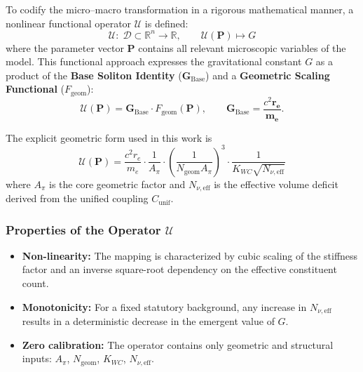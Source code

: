 \documentclass[10pt,a4paper]{article}
\begin{document}
To codify the micro–macro transformation in a rigorous mathematical manner, a nonlinear functional operator \(\mathcal{U}\) is defined:
\begin{equation}
	\mathcal{U}:\; \mathcal{D}\subset\mathbb{R}^n \to \mathbb{R},\qquad
	\mathcal{U}(\mathbf{P}) \mapsto G
	\label{eq:U_map_G}
\end{equation}
where the parameter vector \(\mathbf{P}\) contains all relevant microscopic variables of the model. This functional approach expresses the gravitational constant \(G\) as a product of the \textbf{Base Soliton Identity} (\(\mathbf{G}_{\text{Base}}\)) and a \textbf{Geometric Scaling Functional} (\(F_{\text{geom}}\)):
\begin{equation}
	\mathcal{U}(\mathbf{P})
	=
	\mathbf{G}_{\text{Base}}
	\cdot
	F_{\text{geom}}(\mathbf{P}),
	\qquad
	\mathbf{G}_{\text{Base}} = \frac{c^2 \mathbf{r_e}}{\mathbf{m_e}} .
	\label{eq:G_decomposition}
\end{equation}

The explicit geometric form used in this work is
\begin{equation}
	\boxed{
		\mathcal{U}(\mathbf{P})
		=
		\frac{c^2 r_e}{m_e}
		\cdot
		\frac{1}{A_\pi}
		\cdot
		\left(
		\frac{1}{N_{\text{geom}} A_\pi}
		\right)^{3}
		\cdot
		\frac{1}{K_{WC} \sqrt{N_{\nu,\text{eff}}}}
	}
	\label{eq:G_final_boxed}
\end{equation}
where \(A_\pi\) is the core geometric factor and \(N_{\nu,\text{eff}}\) is the effective volume deficit derived from the unified coupling \(C_{\text{unif}}\).

\subsubsection*{Properties of the Operator \(\mathcal{U}\)}
\begin{itemize}
	\item \textbf{Non-linearity:}
	The mapping is characterized by cubic scaling of the stiffness factor and an inverse square-root dependency on the effective constituent count.
	\item \textbf{Monotonicity:}
	For a fixed statutory background, any increase in \(N_{\nu,\text{eff}}\) results in a deterministic decrease in the emergent value of \(G\).
	\item \textbf{Zero calibration:}
	The operator contains only geometric and structural inputs: \(A_\pi\), \(N_{\text{geom}}\), \(K_{WC}\), \(N_{\nu,\text{eff}}\).
\end{itemize}
\end{document}
